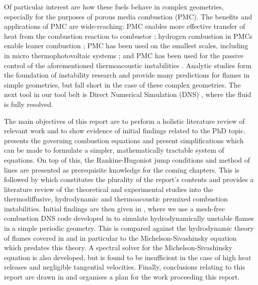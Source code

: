Of particular interest are how these fuels behave in complex geometries, especially for the purposes of porous media combustion (PMC). The benefits and applications of PMC are wide-reaching: PMC enables more effective transfer of heat from the combustion reaction to combustor \cite{mujeebu2009CombustionPorousMedia}; hydrogen combustion in PMCs enable leaner combustion \cite{tseng2002EffectsHydrogenAddition}; PMC has been used on the smallest scales, including in micro thermophotovoltaic systems \cite{pan2015HydrogenOxygenPremixed}; and PMC has been used for the passive control of the aforementioned thermoacoustic instabilities \cite{meadows2015PorousInsertsPassive, dowd2018ThermoacousticInstabilityModel}. Analytic studies form the foundation of instability research and provide many predictions for flames in simple geometries, but fall short in the case of these complex geometries. The next tool in our tool belt is Direct Numerical Simulation (DNS) \cite{orszag1970AnalyticalTheoriesTurbulence}, where the fluid is fully resolved.

The main objectives of this report are to perform a holistic literature review of relevant work and to show evidence of initial findings related to the PhD topic.  presents the governing combustion equations and present simplifications which can be made to formulate a simpler, mathematically tractable system of equations. On top of this, the Rankine-Hugoniot jump conditions and method of lines are presented as prerequisite knowledge for the coming chapters. This is followed by  which constitutes the plurality of the report's contents and provides a literature review of the theoretical and experimental studies into the thermodiffusive, hydrodynamic and thermoacoustic premixed combustion instabilities. Initial findings are then given in , where we use a mesh-free combustion DNS code developed in \cite{king2022HighorderSimulationsIsothermal, king2024MeshfreeFrameworkHighorder, king2020HighOrderDifference, king2024SunsetFlamesDNSCode} to simulate hydrodynamically unstable flames in a simple periodic geometry. This is compared against the hydrodynamic theory of flames covered in  and in particular to the Michelson-Sivashinsky equation which predates this theory. A spectral solver for the Michelson-Sivashinsky equation is also developed, but is found to be insufficient in the case of high heat releases and negligible tangential velocities. Finally, conclusions relating to this report are drawn in  and  organises a plan for the work proceeding this report.




